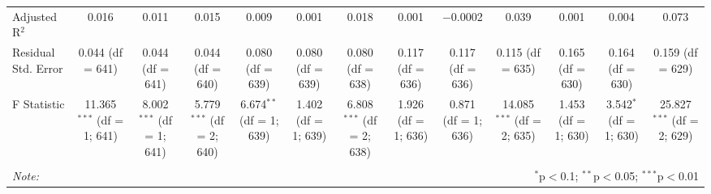 \begin{table}[!htbp]
\begin{tabular}{@{\extracolsep{5pt}}lcccccccccccc}
Adjusted R$^{2}$ & 0.016 & 0.011 & 0.015 & 0.009 & 0.001 & 0.018 & 0.001 & $-$0.0002 & 0.039 & 0.001 & 0.004 & 0.073 \\ 
Residual Std. Error & 0.044 (df = 641) & 0.044 (df = 641) & 0.044 (df = 640) & 0.080 (df = 639) & 0.080 (df = 639) & 0.080 (df = 638) & 0.117 (df = 636) & 0.117 (df = 636) & 0.115 (df = 635) & 0.165 (df = 630) & 0.164 (df = 630) & 0.159 (df = 629) \\ 
F Statistic & 11.365$^{***}$ (df = 1; 641) & 8.002$^{***}$ (df = 1; 641) & 5.779$^{***}$ (df = 2; 640) & 6.674$^{**}$ (df = 1; 639) & 1.402 (df = 1; 639) & 6.808$^{***}$ (df = 2; 638) & 1.926 (df = 1; 636) & 0.871 (df = 1; 636) & 14.085$^{***}$ (df = 2; 635) & 1.453 (df = 1; 630) & 3.542$^{*}$ (df = 1; 630) & 25.827$^{***}$ (df = 2; 629) \\ 
\hline 
\hline \\[-1.8ex] 
\textit{Note:}  & \multicolumn{12}{r}{$^{*}$p$<$0.1; $^{**}$p$<$0.05; $^{***}$p$<$0.01} \\ 
\end{tabular} 
\end{table} 
